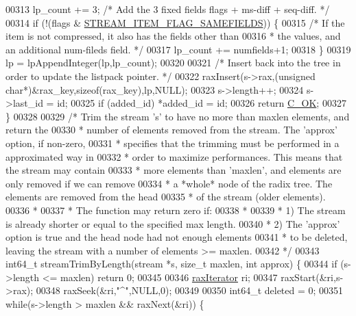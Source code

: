 \begin{DoxyCode}
{00313     lp\_count += 3; \textcolor{comment}{/* Add the 3 fixed fields flags + ms-diff + seq-diff. */}
00314     \textcolor{keywordflow}{if} (!(flags & \hyperlink{t__stream_8c_a6977b456a646762a7650d432a06dc6c5}{STREAM\_ITEM\_FLAG\_SAMEFIELDS})) \{
00315         \textcolor{comment}{/* If the item is not compressed, it also has the fields other than}
00316 \textcolor{comment}{         * the values, and an additional num-fileds field. */}
00317         lp\_count += numfields+1;
00318     \}
00319     lp = lpAppendInteger(lp,lp\_count);
00320 
00321     \textcolor{comment}{/* Insert back into the tree in order to update the listpack pointer. */}
00322     raxInsert(s->rax,(\textcolor{keywordtype}{unsigned} \textcolor{keywordtype}{char}*)&rax\_key,\textcolor{keyword}{sizeof}(rax\_key),lp,NULL);
00323     s->length++;
00324     s->last\_id = id;
00325     \textcolor{keywordflow}{if} (added\_id) *added\_id = id;
00326     \textcolor{keywordflow}{return} \hyperlink{server_8h_a303769ef1065076e68731584e758d3e1}{C\_OK};
00327 \}
00328 
00329 \textcolor{comment}{/* Trim the stream 's' to have no more than maxlen elements, and return the}
00330 \textcolor{comment}{ * number of elements removed from the stream. The 'approx' option, if non-zero,}
00331 \textcolor{comment}{ * specifies that the trimming must be performed in a approximated way in}
00332 \textcolor{comment}{ * order to maximize performances. This means that the stream may contain}
00333 \textcolor{comment}{ * more elements than 'maxlen', and elements are only removed if we can remove}
00334 \textcolor{comment}{ * a *whole* node of the radix tree. The elements are removed from the head}
00335 \textcolor{comment}{ * of the stream (older elements).}
00336 \textcolor{comment}{ *}
00337 \textcolor{comment}{ * The function may return zero if:}
00338 \textcolor{comment}{ *}
00339 \textcolor{comment}{ * 1) The stream is already shorter or equal to the specified max length.}
00340 \textcolor{comment}{ * 2) The 'approx' option is true and the head node had not enough elements}
00341 \textcolor{comment}{ *    to be deleted, leaving the stream with a number of elements >= maxlen.}
00342 \textcolor{comment}{ */}
00343 int64\_t streamTrimByLength(stream *s, size\_t maxlen, \textcolor{keywordtype}{int} approx) \{
00344     \textcolor{keywordflow}{if} (s->length <= maxlen) \textcolor{keywordflow}{return} 0;
00345 
00346     \hyperlink{structraxIterator}{raxIterator} ri;
00347     raxStart(&ri,s->rax);
00348     raxSeek(&ri,\textcolor{stringliteral}{"^"},NULL,0);
00349 
00350     int64\_t deleted = 0;
00351     \textcolor{keywordflow}{while}(s->length > maxlen && raxNext(&ri)) \{
}
\end{DoxyCode}
